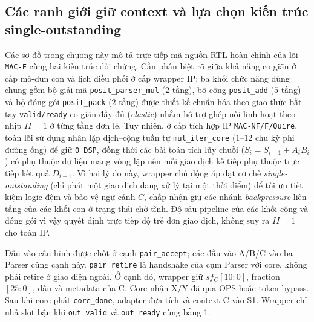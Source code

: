 \subsection{Các ranh giới giữ context và lựa chọn kiến trúc single-outstanding}
\label{subsec:single-outstanding}

Các sơ đồ trong chương này mô tả trực tiếp mã nguồn RTL hoàn chỉnh của lõi
\texttt{MAC-F} cùng hai kiến trúc đối chứng. Cần phân biệt rõ giữa khả năng co
giãn ở cấp mô-đun con và lịch điều phối ở cấp wrapper IP: ba khối chức năng
dùng chung gồm bộ giải mã \texttt{posit\_parser\_mul} ($2$ tầng), bộ cộng
\texttt{posit\_add} ($5$ tầng) và bộ đóng gói \texttt{posit\_pack} ($2$ tầng)
được thiết kế chuẩn hóa theo giao thức bắt tay \texttt{valid/ready} co giãn đầy
đủ (\textit{elastic}) nhằm hỗ trợ ghép nối linh hoạt theo nhịp $II=1$ ở từng
tầng đơn lẻ. Tuy nhiên, ở cấp tích hợp IP \texttt{MAC-NF/F/Quire}, toàn lõi sử
dụng nhân lặp dịch--cộng tuần tự \texttt{mul\_iter\_core} ($1\text{--}12$ chu kỳ
phi đường ống) để giữ \texttt{0 DSP}, đồng thời các bài toán tích lũy chuỗi
($S_i = S_{i-1} + A_i B_i$) có phụ thuộc dữ liệu mang vòng lặp nên mỗi giao dịch
kế tiếp phụ thuộc trực tiếp kết quả $D_{i-1}$. Vì hai lý do này, wrapper chủ động
áp đặt cơ chế \textit{single-outstanding} (chỉ phát một giao dịch đang xử lý tại
một thời điểm) để tối ưu tiết kiệm logic đệm và bảo vệ ngữ cảnh $C$, chấp nhận giữ
các nhánh \textit{backpressure} liên tầng của các khối con ở trạng thái chờ tĩnh.
Độ sâu pipeline của các khối cộng và đóng gói vì vậy quyết định trực tiếp độ
trễ đơn giao dịch, không suy ra $II=1$ cho toàn IP.



Đầu vào cấu hình được chốt ở cạnh \texttt{pair\_accept}; các đầu vào A/B/C
vào ba Parser cùng cạnh này. \texttt{pair\_retire} là handshake của cụm
Parser với core, không phải retire ở giao diện ngoài. Ở cạnh đó, wrapper
giữ $sf_C[10:0]$, fraction $[25:0]$, dấu và metadata của C. Core nhận
X/Y đã qua OPS hoặc token bypass. Sau khi core phát \texttt{core\_done},
adapter đưa tích và context C vào S1. Wrapper chỉ nhả slot bận khi
\texttt{out\_valid} và \texttt{out\_ready} cùng bằng 1.

